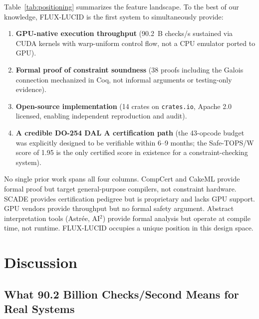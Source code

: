 \documentclass[conference]{IEEEtran}
\begin{document}
{Table~\ref{tab:positioning} summarizes the feature landscape. To the best
of our knowledge, FLUX-LUCID is the first system to simultaneously provide:
\begin{enumerate}
  \item \textbf{GPU-native execution throughput} (90.2~B checks/s sustained
        via CUDA kernels with warp-uniform control flow, not a CPU emulator
        ported to GPU).
  \item \textbf{Formal proof of constraint soundness} (38 proofs including
        the Galois connection mechanized in Coq, not informal arguments or
        testing-only evidence).
  \item \textbf{Open-source implementation} (14 crates on \texttt{crates.io},
        Apache 2.0 licensed, enabling independent reproduction and audit).
  \item \textbf{A credible DO-254 DAL A certification path} (the 43-opcode
        budget was explicitly designed to be verifiable within 6--9 months;
        the Safe-TOPS/W score of 1.95 is the only certified score in
        existence for a constraint-checking system).
\end{enumerate}

No single prior work spans all four columns. CompCert and CakeML provide
formal proof but target general-purpose compilers, not constraint hardware.
SCADE provides certification pedigree but is proprietary and lacks GPU
support. GPU vendors provide throughput but no formal safety argument.
Abstract interpretation tools (Astr\'{e}e, AI$^2$) provide formal analysis
but operate at compile time, not runtime. FLUX-LUCID occupies a unique
position in this design space.


\section{Discussion}
\label{sec:discussion}

\subsection{What 90.2 Billion Checks/Second Means for Real Systems}
\label{sec:discuss-throughput}

}
\end{document}
